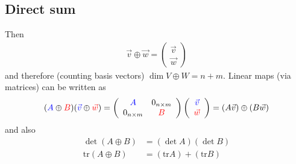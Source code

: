 \documentclass[../main.tex]{subfiles}
\begin{document}
\subsection{Direct sum}
Then
\begin{align}
\vec{v}\oplus\vec{w}
=\left(\begin{array}{c}
\vec{v}\\
\vec{w}
\end{array}\right)
\end{align}
and therefore (counting basis vectors) $\dim{V\oplus W}=n+m$. Linear maps (via matrices) can be written as
\begin{align}
(\textcolor{blue}{A}\oplus \textcolor{red}{B})
(\textcolor{blue}{\vec{v}}\oplus\textcolor{red}{\vec{w}})=
\left(\begin{array}{cc}
\textcolor{blue}{A} & 0_{n\times m}\\
0_{n\times m} & \textcolor{red}{B}\\
\end{array}\right)
\left(\begin{array}{c}
\textcolor{blue}{\vec{v}}\\
\textcolor{red}{\vec{w}}
\end{array}\right)
=(A\vec{v})\oplus(B\vec{w})
\end{align}
and also
\begin{align}
\det(A\oplus B)&=(\det A)(\det B)\\
\text{tr}(A\oplus B)&=(\text{tr} A)+(\text{tr} B)
\end{align}
\end{document}

